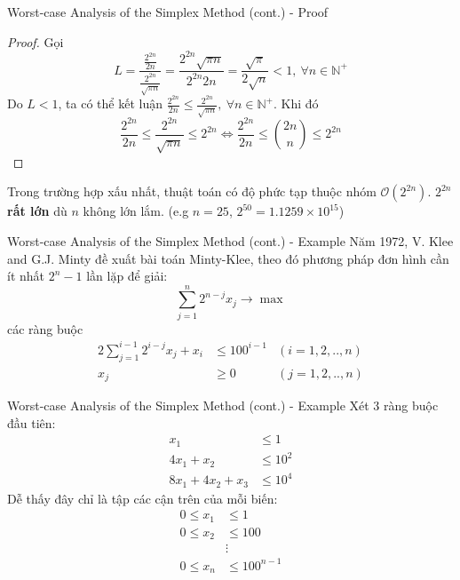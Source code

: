 \documentclass[10pt]{beamer}
\begin{document}
\begin{frame}{Worst-case Analysis of the Simplex Method (cont.) - Proof}
\begin{proof}
Gọi
$$
\displaystyle
L = \frac{\frac{2^{2n}}{2n}}{\frac{2^{2n}}{\sqrt{\pi n}}} = \frac{2^{2n}\sqrt{\pi n}}{2^{2n} 2n} = \frac{\sqrt{\pi}}{2\sqrt{n}} < 1,\ \forall n \in \mathbb{N^+}
$$
Do $L < 1$, ta có thể kết luận $\frac{2^{2n}}{2n} \leq \frac{2^{2n}}{\sqrt{\pi n}},\ \forall n \in \mathbb{N^+}
$. Khi đó
$$
\displaystyle
\frac{2^{2n}}{2n} \leq \frac{2^{2n}}{\sqrt{\pi n}} \leq 2^{2n} \iff \frac{2^{2n}}{2n} \leq \binom{2n}{n} \leq 2^{2n}
$$
\end{proof}
Trong trường hợp xấu nhất, thuật toán có độ phức tạp thuộc nhóm $\mathcal{O}(2^{2n})$. $2^{2n}$ \textbf{rất lớn} dù $n$ không lớn lắm. (e.g $n = 25$, $2^{50} = 1.1259\times 10^{15}$)
\end{frame}

\begin{frame}{Worst-case Analysis of the Simplex Method (cont.) - Example}
Năm 1972, V. Klee and G.J. Minty\cite{klee1970good} đề xuất bài toán Minty-Klee, theo đó phương pháp đơn hình cần ít nhất $2^n - 1$ lần lặp để giải:
\begin{equation*}
\sum_{j = 1}^{n} 2^{n - j} x_j \rightarrow \max
\end{equation*}
các ràng buộc
\begin{equation*}
\begin{aligned}
2\sum_{j = 1}^{i - 1} 2^{i - j}x_j + x_i &\leq 100^{i - 1} & (i = 1, 2, .., n)\\
x_j &\geq 0 & (j = 1, 2, .., n)
\end{aligned}
\end{equation*}
\end{frame}

\begin{frame}{Worst-case Analysis of the Simplex Method (cont.) - Example}
Xét 3 ràng buộc đầu tiên:
\begin{equation*}
\begin{aligned}
x_1 &\leq 1\\
4x_1 + x_2 &\leq 10^2\\
8x_1 + 4x_2 + x_3 &\leq 10^4
\end{aligned}
\end{equation*}
Dễ thấy đây chỉ là tập các cận trên của mỗi biến:
\begin{equation*}
\begin{aligned}
0 \leq x_1 &\leq 1\\
0 \leq x_2 &\leq 100\\
&\vdots\\
0 \leq x_n &\leq 100^{n - 1}
\end{aligned}
\end{equation*}
\end{frame}
\end{document}

